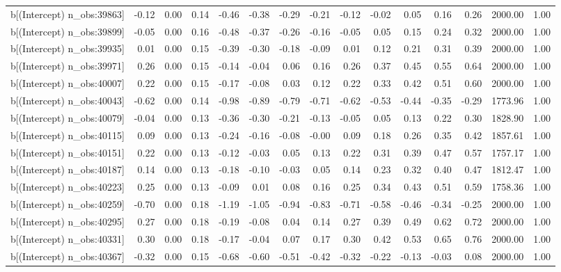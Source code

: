 \begin{table}[ht]
\begin{tabular}{rrrrrrrrrrrrrrr}
  b[(Intercept) n\_obs:39863] & -0.12 & 0.00 & 0.14 & -0.46 & -0.38 & -0.29 & -0.21 & -0.12 & -0.02 & 0.05 & 0.16 & 0.26 & 2000.00 & 1.00 \\ 
  b[(Intercept) n\_obs:39899] & -0.05 & 0.00 & 0.16 & -0.48 & -0.37 & -0.26 & -0.16 & -0.05 & 0.05 & 0.15 & 0.24 & 0.32 & 2000.00 & 1.00 \\ 
  b[(Intercept) n\_obs:39935] & 0.01 & 0.00 & 0.15 & -0.39 & -0.30 & -0.18 & -0.09 & 0.01 & 0.12 & 0.21 & 0.31 & 0.39 & 2000.00 & 1.00 \\ 
  b[(Intercept) n\_obs:39971] & 0.26 & 0.00 & 0.15 & -0.14 & -0.04 & 0.06 & 0.16 & 0.26 & 0.37 & 0.45 & 0.55 & 0.64 & 2000.00 & 1.00 \\ 
  b[(Intercept) n\_obs:40007] & 0.22 & 0.00 & 0.15 & -0.17 & -0.08 & 0.03 & 0.12 & 0.22 & 0.33 & 0.42 & 0.51 & 0.60 & 2000.00 & 1.00 \\ 
  b[(Intercept) n\_obs:40043] & -0.62 & 0.00 & 0.14 & -0.98 & -0.89 & -0.79 & -0.71 & -0.62 & -0.53 & -0.44 & -0.35 & -0.29 & 1773.96 & 1.00 \\ 
  b[(Intercept) n\_obs:40079] & -0.04 & 0.00 & 0.13 & -0.36 & -0.30 & -0.21 & -0.13 & -0.05 & 0.05 & 0.13 & 0.22 & 0.30 & 1828.90 & 1.00 \\ 
  b[(Intercept) n\_obs:40115] & 0.09 & 0.00 & 0.13 & -0.24 & -0.16 & -0.08 & -0.00 & 0.09 & 0.18 & 0.26 & 0.35 & 0.42 & 1857.61 & 1.00 \\ 
  b[(Intercept) n\_obs:40151] & 0.22 & 0.00 & 0.13 & -0.12 & -0.03 & 0.05 & 0.13 & 0.22 & 0.31 & 0.39 & 0.47 & 0.57 & 1757.17 & 1.00 \\ 
  b[(Intercept) n\_obs:40187] & 0.14 & 0.00 & 0.13 & -0.18 & -0.10 & -0.03 & 0.05 & 0.14 & 0.23 & 0.32 & 0.40 & 0.47 & 1812.47 & 1.00 \\ 
  b[(Intercept) n\_obs:40223] & 0.25 & 0.00 & 0.13 & -0.09 & 0.01 & 0.08 & 0.16 & 0.25 & 0.34 & 0.43 & 0.51 & 0.59 & 1758.36 & 1.00 \\ 
  b[(Intercept) n\_obs:40259] & -0.70 & 0.00 & 0.18 & -1.19 & -1.05 & -0.94 & -0.83 & -0.71 & -0.58 & -0.46 & -0.34 & -0.25 & 2000.00 & 1.00 \\ 
  b[(Intercept) n\_obs:40295] & 0.27 & 0.00 & 0.18 & -0.19 & -0.08 & 0.04 & 0.14 & 0.27 & 0.39 & 0.49 & 0.62 & 0.72 & 2000.00 & 1.00 \\ 
  b[(Intercept) n\_obs:40331] & 0.30 & 0.00 & 0.18 & -0.17 & -0.04 & 0.07 & 0.17 & 0.30 & 0.42 & 0.53 & 0.65 & 0.76 & 2000.00 & 1.00 \\ 
  b[(Intercept) n\_obs:40367] & -0.32 & 0.00 & 0.15 & -0.68 & -0.60 & -0.51 & -0.42 & -0.32 & -0.22 & -0.13 & -0.03 & 0.08 & 2000.00 & 1.00 \\ 

\end{tabular}
\end{table}
